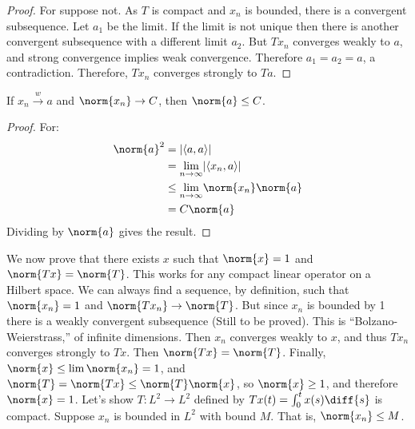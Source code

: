         \begin{proof}
            For suppose not. As $T$ is compact and
            $x_{n}$ is bounded, there is
            a convergent subsequence. Let $a_{1}$ be the
            limit. If the limit is not unique then there
            is another convergent subsequence with
            a different limit $a_{2}$. But
            $Tx_{n}$ converges weakly to
            $a$, and strong convergence implies weak
            convergence. Therefore $a_{1}=a_{2}=a$, a
            contradiction. Therefore, $Tx_{n}$ converges
            strongly to $Ta$.
        \end{proof}
        \begin{theorem}
            If $x_{n}\overset{w}{\rightarrow}{a}$
            and $\norm{x_{n}}\rightarrow{C}$,
            then $\norm{a}\leq{C}$.
        \end{theorem}
        \begin{proof}
            For:
            \begin{align*}
                \norm{a}^{2}&=|\langle{a,a}\rangle|\\
                &=\underset{n\rightarrow\infty}{\lim}
                |\langle{x_{n},a}\rangle|\\
                &\leq\underset{n\rightarrow\infty}{\lim}
                \norm{x_{n}}\norm{a}\\
                &=C\norm{a}
            \end{align*}
            Dividing by $\norm{a}$ gives the result.
        \end{proof}
        We now prove that there exists $x$ such that
        $\norm{x}=1$ and $\norm{Tx}=\norm{T}$. This works
        for any compact linear operator on a Hilbert space.
        We can always find a sequence, by definition, such
        that $\norm{x_{n}}=1$ and
        $\norm{Tx_{n}}\rightarrow\norm{T}$. But since
        $x_{n}$ is bounded by 1 there is a weakly
        convergent subsequence (Still to be proved).
        This is ``Bolzano-Weierstrass,'' of infinite
        dimensions. Then $x_{n}$ converges weakly to
        $x$, and thus $Tx_{n}$ converges strongly to
        $Tx$. Then $\norm{Tx}=\norm{T}$. Finally,
        $\norm{x}\leq\lim\norm{x_{n}}=1$, and
        $\norm{T}=\norm{Tx}\leq\norm{T}\norm{x}$,
        so $\norm{x}\geq{1}$, and therefore
        $\norm{x}=1$. Let's show $T:L^{2}\rightarrow{L}^{2}$
        defined by $Tx(t)=\int_{0}^{t}x(s)\diff{s}$ is
        compact. Suppose $x_{n}$ is bounded in $L^{2}$ with
        bound $M$. That is, $\norm{x_{n}}\leq{M}$.
